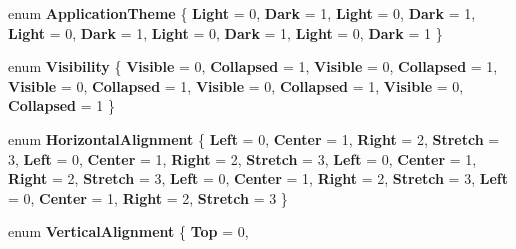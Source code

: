 \begin{DoxyCompactItemize}
\item 
\mbox{\label{namespace_windows_1_1_u_i_1_1_xaml_ace78659e508744cb10b2d252833ef022}} 
enum {\bfseries Application\+Theme} \{ \newline
{\bfseries Light} = 0, 
{\bfseries Dark} = 1, 
{\bfseries Light} = 0, 
{\bfseries Dark} = 1, 
\newline
{\bfseries Light} = 0, 
{\bfseries Dark} = 1, 
{\bfseries Light} = 0, 
{\bfseries Dark} = 1, 
\newline
{\bfseries Light} = 0, 
{\bfseries Dark} = 1
 \}
\item 
\mbox{\label{namespace_windows_1_1_u_i_1_1_xaml_ab3fbc626243929a7adbc7f2170933135}} 
enum {\bfseries Visibility} \{ \newline
{\bfseries Visible} = 0, 
{\bfseries Collapsed} = 1, 
{\bfseries Visible} = 0, 
{\bfseries Collapsed} = 1, 
\newline
{\bfseries Visible} = 0, 
{\bfseries Collapsed} = 1, 
{\bfseries Visible} = 0, 
{\bfseries Collapsed} = 1, 
\newline
{\bfseries Visible} = 0, 
{\bfseries Collapsed} = 1
 \}
\item 
\mbox{\label{namespace_windows_1_1_u_i_1_1_xaml_a296d6e339e45f69b5f76a1183a51fef6}} 
enum {\bfseries Horizontal\+Alignment} \{ \newline
{\bfseries Left} = 0, 
{\bfseries Center} = 1, 
{\bfseries Right} = 2, 
{\bfseries Stretch} = 3, 
\newline
{\bfseries Left} = 0, 
{\bfseries Center} = 1, 
{\bfseries Right} = 2, 
{\bfseries Stretch} = 3, 
\newline
{\bfseries Left} = 0, 
{\bfseries Center} = 1, 
{\bfseries Right} = 2, 
{\bfseries Stretch} = 3, 
\newline
{\bfseries Left} = 0, 
{\bfseries Center} = 1, 
{\bfseries Right} = 2, 
{\bfseries Stretch} = 3, 
\newline
{\bfseries Left} = 0, 
{\bfseries Center} = 1, 
{\bfseries Right} = 2, 
{\bfseries Stretch} = 3
 \}
\item 
\mbox{\label{namespace_windows_1_1_u_i_1_1_xaml_adfb3c11d5572410fe610ae02feb31cd1}} 
enum {\bfseries Vertical\+Alignment} \{ \newline
{\bfseries Top} = 0, 

\end{DoxyCompactItemize}
